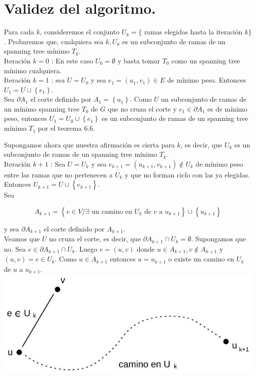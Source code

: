 \documentclass[10pt]{article}
\begin{document}
\section*{Validez del algoritmo.}
Para cada $k$, consideremos el conjunto $U_{k}=\{$ ramas elegidas hasta la iteración $k\}$. Probaremos que, cualquiera sea $k, U_{k}$ es un subconjunto de ramas de un spanning tree mínimo $T_{k}$.\\
Iteración $k=0$ : En este caso $U_{0}=\emptyset$ y basta tomar $T_{0}$ como un spanning tree mínimo cualquiera.\\
Iteración $k=1$ : sea $U=U_{0}$ y sea $e_{1}=\left(u_{1}, v_{1}\right) \in E$ de mínimo peso. Entonces $U_{1}=U \cup\left\{e_{1}\right\}$.\\
Sea $\partial A_{1}$ el corte definido por $A_{1}=\left\{u_{1}\right\}$. Como $U$ un subconjunto de ramas de un mínimo spanning tree $T_{0}$ de $G$ que no cruza el corte y $e_{1} \in \partial A_{1}$ es de mínimo peso, entonces $U_{1}=U_{0} \cup\left\{e_{1}\right\}$ es un subconjunto de ramas de un spanning tree mínimo $T_{1}$ por el teorema 6.6.

Supongamos ahora que nuestra afirmación es cierta para $k$, es decir, que $U_{k}$ es un subconjunto de ramas de un spanning tree mínimo $T_{k}$.\\
Iteración $k+1$ : Sea $U=U_{k}$ y sea $e_{k+1}=\left(u_{k+1}, v_{k+1}\right) \notin U_{k}$ de mínimo peso entre las ramas que no pertenecen a $U_{k}$ y que no forman ciclo con las ya elegidas. Entonces $U_{k+1}=U \cup\left\{e_{k+1}\right\}$.\\
Sea

$$
A_{k+1}=\left\{v \in V / \exists \text { un camino en } U_{k} \text { de } v \text { a } u_{k+1}\right\} \cup\left\{u_{k+1}\right\}
$$

y sea $\partial A_{k+1}$ el corte definido por $A_{k+1}$.\\
Veamos que $U$ no cruza el corte, es decir, que $\partial A_{k+1} \cap U_{k}=\emptyset$. Supongamos que no. Sea $e \in \partial A_{k+1} \cap U_{k}$. Luego $e=(u, v)$ donde $u \in A_{k+1}, v \notin A_{k+1}$ y $(u, v)=e \in U_{k}$. Como $u \in A_{k+1}$ entonces $u=u_{k+1}$ o existe un camino en $U_{k}$ de $u$ a $u_{k+1}$.\\
\includegraphics[max width=\textwidth, center]{2025_09_05_93c7c1835f249f70c0eeg-18(1)}
\end{document}
